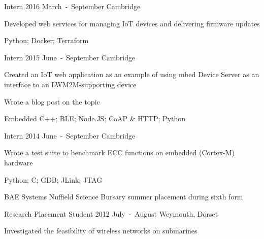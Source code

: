 \begin{cventries}
\cventryrole
  {Intern}
  {2016 March~-~September}
  {Cambridge}
  {\begin{cvitems}
    \item {Developed web services for managing IoT devices and delivering firmware updates}
    \item {Python; Docker; Terraform}
  \end{cvitems}}

\cventryrole
  {Intern}
  {2015 June~-~September}
  {Cambridge}
  {\begin{cvitems}
    \item {Created an IoT web application as an example of using mbed Device Server as an interface to an LWM2M-supporting device}
    \item {Wrote a blog post on the topic}
    \item {Embedded C++; BLE; Node.JS; CoAP \& HTTP; Python}
  \end{cvitems}}

\cventryrole
  {Intern}
  {2014 June~-~September}
  {Cambridge}
  {\begin{cvitems}
    \item {Wrote a test suite to benchmark ECC functions on embedded (Cortex-M) hardware}
    \item {Python; C; GDB; JLink; JTAG}
  \end{cvitems}}

\cventryjob
  {BAE Systems}
  {Nuffield Science Bursary summer placement during sixth form}

\cventryrole
  {Research Placement Student}
  {2012 July~-~August}
  {Weymouth, Dorset}
  {\begin{cvitems}
    \item {Investigated the feasibility of wireless networks on submarines}
  \end{cvitems}}

\end{cventries}
